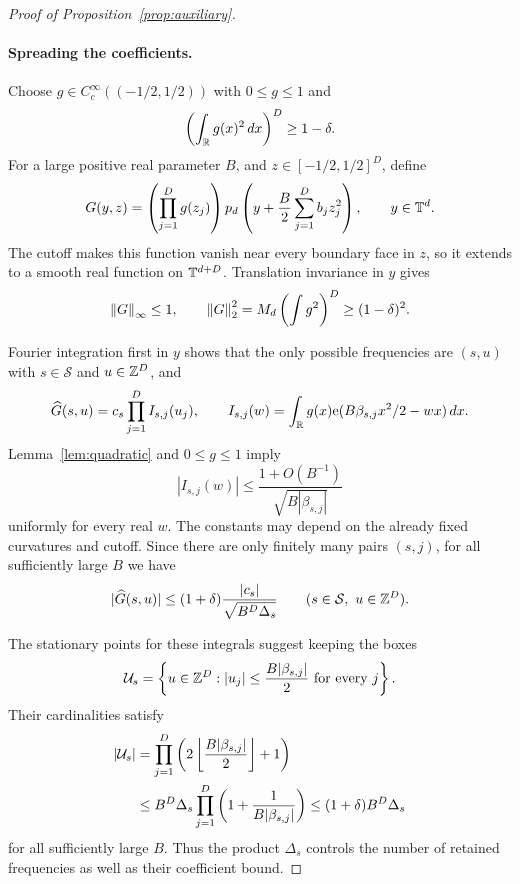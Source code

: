 \begin{proof}[Proof of Proposition~\ref{prop:auxiliary}]
\paragraph{Spreading the coefficients.}
Choose $g\in C_c^\infty((-1/2,1/2))$ with $0\le g\le1$ and
\[
 \left(\int_{\mathbb R}g(x)^2\,dx\right)^D\ge1-\delta.
\]
For a large positive real parameter $B$, and
$z\in[-1/2,1/2]^D$, define
\begin{equation}
 \label{eq:spread-function}
 G(y,z)=\left(\prod_{j=1}^Dg(z_j)\right)
 p_d\left(y+\frac B2\sum_{j=1}^Db_jz_j^2\right),
 \qquad y\in\mathbb T^d.
\end{equation}
The cutoff makes this function vanish near every boundary face in
$z$, so it extends to a smooth real function on $\mathbb T^{d+D}$.
Translation invariance in $y$ gives
\begin{equation}
 \label{eq:spread-norms}
 \left\lVert G\right\rVert_\infty\le1,
 \qquad
 \left\lVert G\right\rVert_2^2=M_d\left(\int g^2\right)^D\ge(1-\delta)^2.
\end{equation}

Fourier integration first in $y$ shows that the only possible
frequencies are $(s,u)$ with $s\in\mathcal S$ and $u\in\mathbb Z^D$, and
\begin{equation}
 \label{eq:spread-coefficients}
 \widehat G(s,u)=c_s\prod_{j=1}^DI_{s,j}(u_j),
 \qquad
 I_{s,j}(w)=\int_{\mathbb R}g(x)\mathrm e(B\beta_{s,j}x^2/2-wx)\,dx.
\end{equation}
Lemma~\ref{lem:quadratic} and $0\le g\le1$ imply
\[
 |I_{s,j}(w)|\le
 \frac{1+O(B^{-1})}{\sqrt{B|\beta_{s,j}|}}
\]
uniformly for every real $w$.  The constants may depend on the
already fixed curvatures and cutoff.  Since there are only finitely
many pairs $(s,j)$, for all sufficiently large $B$ we have
\begin{equation}
 \label{eq:spread-coefficient-bound}
 |\widehat G(s,u)|\le
 (1+\delta)\frac{|c_s|}{\sqrt{B^D\Delta_s}}
 \qquad(s\in\mathcal S,\ u\in\mathbb Z^D).
\end{equation}

The stationary points for these integrals suggest keeping the boxes
\[
 \mathcal U_s=
 \left\{u\in\mathbb Z^D: |u_j|\le\frac{B|\beta_{s,j}|}{2}
       \text{ for every }j\right\}.
\]
Their cardinalities satisfy
\begin{align}
 |\mathcal U_s|
 &=\prod_{j=1}^D\left(2\left\lfloor
                  \frac{B|\beta_{s,j}|}{2}\right\rfloor+1\right)
 \notag\\
 &\le B^D\Delta_s\prod_{j=1}^D
       \left(1+\frac1{B|\beta_{s,j}|}\right)
 \le(1+\delta)B^D\Delta_s
 \label{eq:spread-box-count}
\end{align}
for all sufficiently large $B$.  Thus the product $\Delta_s$ controls
the number of retained frequencies as well as their coefficient bound.


\end{proof}
